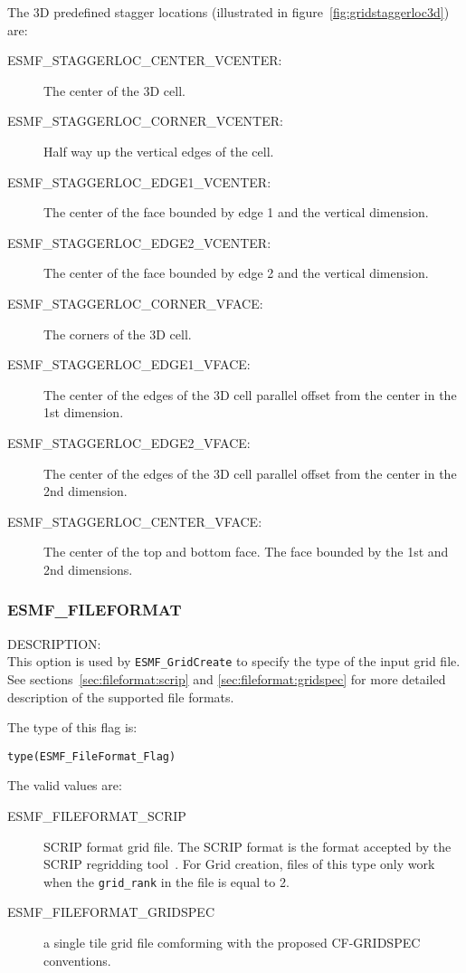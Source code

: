 The 3D predefined stagger locations (illustrated in figure~\ref{fig:gridstaggerloc3d}) are:\\
\begin{description}
\item [ESMF\_STAGGERLOC\_CENTER\_VCENTER:] The center of the 3D cell.
\item [ESMF\_STAGGERLOC\_CORNER\_VCENTER:] Half way up the vertical edges of the cell.
\item [ESMF\_STAGGERLOC\_EDGE1\_VCENTER:] The center of the face bounded by edge 1 and the vertical dimension.
\item [ESMF\_STAGGERLOC\_EDGE2\_VCENTER:] The center of the face bounded by edge 2 and the vertical dimension. 
\item [ESMF\_STAGGERLOC\_CORNER\_VFACE:] The corners of the 3D cell.
\item [ESMF\_STAGGERLOC\_EDGE1\_VFACE:] The center of the edges of the 3D cell parallel offset from the center in the 1st dimension.
\item [ESMF\_STAGGERLOC\_EDGE2\_VFACE:] The center of the edges of the 3D cell parallel offset from the center in the 2nd dimension.
\item [ESMF\_STAGGERLOC\_CENTER\_VFACE:] The center of the top and bottom face. The face bounded by the 1st and 2nd dimensions. 
\end{description}

\subsubsection{ESMF\_FILEFORMAT}
\label{const:grid:fileformat}

{\sf DESCRIPTION:\\}
This option is used by {\tt ESMF\_GridCreate} to specify the type of the input grid file.  See 
sections~\ref{sec:fileformat:scrip} and \ref{sec:fileformat:gridspec} for more detailed description of the supported file formats.

The type of this flag is:

{\tt type(ESMF\_FileFormat\_Flag)}

The valid values are:
\begin{description}
\item [ESMF\_FILEFORMAT\_SCRIP] SCRIP format grid file. The SCRIP format is the format accepted by the SCRIP regridding tool~\cite{ref:SCRIP}.   For Grid creation, files of this type only work when the {\tt grid\_rank} in the file is equal to 2.

\item [ESMF\_FILEFORMAT\_GRIDSPEC] a single tile grid file comforming with the proposed CF-GRIDSPEC conventions.
\end{description}

